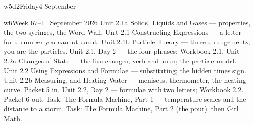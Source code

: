 \documentclass[11pt]{article}
\begin{document}
\begin{daypage}{w5d2}{Friday}{4 September}
  {
   }
  {
   }
  {}
  {
   }
  {
   }
  {
   }
\end{daypage}

\clearpage
\renewcommand{\currentweek}{Week 6 \sep 7--11 September}

\begin{weekoverview}{w6}{Week 6}{7--11 September 2026}
  {Unit 2.1a Solids, Liquids and Gases --- properties, the two syringes, the
   Word Wall.}
  {Unit 2.1 Constructing Expressions --- a letter for a number you cannot
   count.}
  {Unit 2.1b Particle Theory --- three arrangements; you are the particles.}
  {Unit 2.1, Day 2 --- the four phrases; Workbook 2.1.}
  {Unit 2.2a Changes of State --- the five changes, verb and noun; the particle
   model.}
  {Unit 2.2 Using Expressions and Formulae --- substituting; the hidden times
   sign.}
  {Unit 2.2b Measuring, and Heating Water --- meniscus, thermometer, the
   heating curve. Packet 5 in.}
  {Unit 2.2, Day 2 --- formulae with two letters; Workbook 2.2. Packet 6 out.}
  {Task: The Formula Machine, Part 1 --- temperature scales and the distance to
   a storm.}
  {Task: The Formula Machine, Part 2 (the pour), then Girl Math.}
\end{weekoverview}
\end{document}
